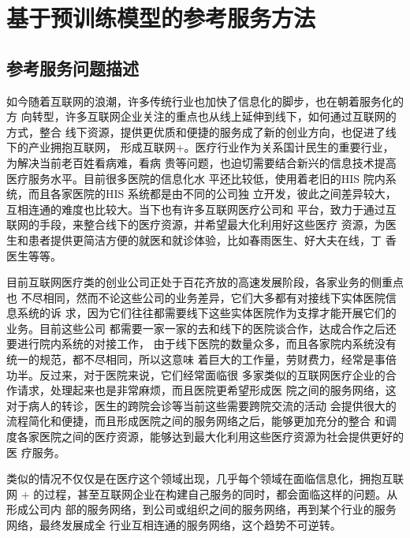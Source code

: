 \chapter{基于预训练模型的参考服务方法}

\section{参考服务问题描述}
如今随着互联网的浪潮，许多传统行业也加快了信息化的脚步，也在朝着服务化的方
向转型，许多互联网企业关注的重点也从线上延伸到线下，如何通过互联网的方式，整合
线下资源，提供更优质和便捷的服务成了新的创业方向，也促进了线下的产业拥抱互联网，
形成互联网+。医疗行业作为关系国计民生的重要行业，为解决当前老百姓看病难，看病
贵等问题，也迫切需要结合新兴的信息技术提高医疗服务水平。目前很多医院的信息化水
平还比较低，使用着老旧的HIS 院内系统，而且各家医院的HIS 系统都是由不同的公司独
立开发，彼此之间差异较大，互相连通的难度也比较大。当下也有许多互联网医疗公司和
平台，致力于通过互联网的手段，来整合线下的医疗资源，并希望最大化利用好这些医疗
资源，为医生和患者提供更简洁方便的就医和就诊体验，比如春雨医生、好大夫在线，丁
香医生等等。

目前互联网医疗类的创业公司正处于百花齐放的高速发展阶段，各家业务的侧重点也
不尽相同，然而不论这些公司的业务差异，它们大多都有对接线下实体医院信息系统的诉
求，因为它们往往都需要线下这些实体医院作为支撑才能开展它们的业务。目前这些公司
都需要一家一家的去和线下的医院谈合作，达成合作之后还要进行院内系统的对接工作，
由于线下医院的数量众多，而且各家院内系统没有统一的规范，都不尽相同，所以这意味
着巨大的工作量，劳财费力，经常是事倍功半。反过来，对于医院来说，它们经常面临很
多家类似的互联网医疗企业的合作请求，处理起来也是非常麻烦，而且医院更希望形成医
院之间的服务网络，这对于病人的转诊，医生的跨院会诊等当前这些需要跨院交流的活动
会提供很大的流程简化和便捷，而且形成医院之间的服务网络之后，能够更加充分的整合
和调度各家医院之间的医疗资源，能够达到最大化利用这些医疗资源为社会提供更好的医
疗服务。

类似的情况不仅仅是在医疗这个领域出现，几乎每个领域在面临信息化，拥抱互联网
+ 的过程，甚至互联网企业在构建自己服务的同时，都会面临这样的问题。从形成公司内
部的服务网络，到公司或组织之间的服务网络，再到某个行业的服务网络，最终发展成全
行业互相连通的服务网络，这个趋势不可逆转。

